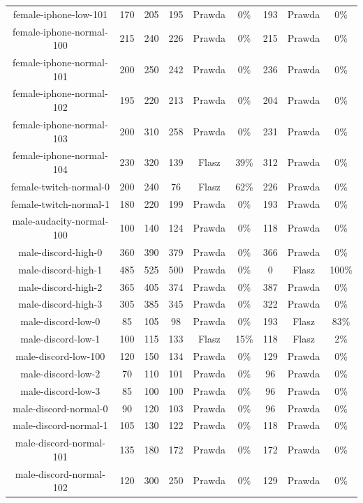 \documentclass[a4paper,12pt]{extarticle}
\begin{document}
\begin{center}
{\begin{tabular}{ |c|c|c|c|c|c|c|c|c| }
female-iphone-low-101 & 170 & 205 & 195 & Prawda & 0\% & 193 & Prawda & 0\% \\
female-iphone-normal-100 & 215 & 240 & 226 & Prawda & 0\% & 215 & Prawda & 0\% \\
female-iphone-normal-101 & 200 & 250 & 242 & Prawda & 0\% & 236 & Prawda & 0\% \\
female-iphone-normal-102 & 195 & 220 & 213 & Prawda & 0\% & 204 & Prawda & 0\% \\
female-iphone-normal-103 & 200 & 310 & 258 & Prawda & 0\% & 231 & Prawda & 0\% \\
female-iphone-normal-104 & 230 & 320 & 139 & Flasz & 39\% & 312 & Prawda & 0\% \\
female-twitch-normal-0 & 200 & 240 & 76 & Flasz & 62\% & 226 & Prawda & 0\% \\
female-twitch-normal-1 & 180 & 220 & 199 & Prawda & 0\% & 193 & Prawda & 0\% \\
male-audacity-normal-100 & 100 & 140 & 124 & Prawda & 0\% & 118 & Prawda & 0\% \\
male-discord-high-0 & 360 & 390 & 379 & Prawda & 0\% & 366 & Prawda & 0\% \\
male-discord-high-1 & 485 & 525 & 500 & Prawda & 0\% & 0 & Flasz & 100\% \\
male-discord-high-2 & 365 & 405 & 374 & Prawda & 0\% & 387 & Prawda & 0\% \\
male-discord-high-3 & 305 & 385 & 345 & Prawda & 0\% & 322 & Prawda & 0\% \\
male-discord-low-0 & 85 & 105 & 98 & Prawda & 0\% & 193 & Flasz & 83\% \\
male-discord-low-1 & 100 & 115 & 133 & Flasz & 15\% & 118 & Flasz & 2\% \\
male-discord-low-100 & 120 & 150 & 134 & Prawda & 0\% & 129 & Prawda & 0\% \\
male-discord-low-2 & 70 & 110 & 101 & Prawda & 0\% & 96 & Prawda & 0\% \\
male-discord-low-3 & 85 & 100 & 100 & Prawda & 0\% & 96 & Prawda & 0\% \\
male-discord-normal-0 & 90 & 120 & 103 & Prawda & 0\% & 96 & Prawda & 0\% \\
male-discord-normal-1 & 105 & 130 & 122 & Prawda & 0\% & 118 & Prawda & 0\% \\
male-discord-normal-101 & 135 & 180 & 172 & Prawda & 0\% & 172 & Prawda & 0\% \\
male-discord-normal-102 & 120 & 300 & 250 & Prawda & 0\% & 129 & Prawda & 0\% \\

\end{tabular}}
\end{center}
\end{document}
